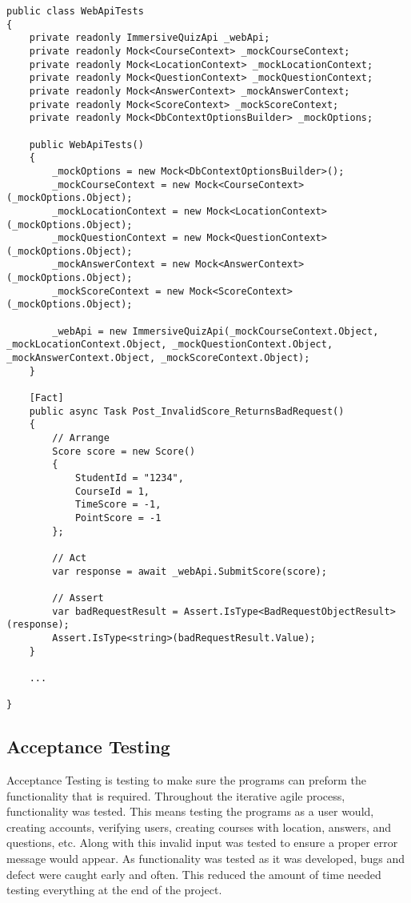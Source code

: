 \begin{lstlisting}[caption=Example Unit Test,label=lst:UnitTest]
public class WebApiTests
{
	private readonly ImmersiveQuizApi _webApi;
	private readonly Mock<CourseContext> _mockCourseContext;
	private readonly Mock<LocationContext> _mockLocationContext;
	private readonly Mock<QuestionContext> _mockQuestionContext;
	private readonly Mock<AnswerContext> _mockAnswerContext;
	private readonly Mock<ScoreContext> _mockScoreContext;
	private readonly Mock<DbContextOptionsBuilder> _mockOptions;
	
	public WebApiTests()
	{
		_mockOptions = new Mock<DbContextOptionsBuilder>();
		_mockCourseContext = new Mock<CourseContext>(_mockOptions.Object);
		_mockLocationContext = new Mock<LocationContext>(_mockOptions.Object);
		_mockQuestionContext = new Mock<QuestionContext>(_mockOptions.Object);
		_mockAnswerContext = new Mock<AnswerContext>(_mockOptions.Object);
		_mockScoreContext = new Mock<ScoreContext>(_mockOptions.Object);
		
		_webApi = new ImmersiveQuizApi(_mockCourseContext.Object, _mockLocationContext.Object, _mockQuestionContext.Object, _mockAnswerContext.Object, _mockScoreContext.Object);
	}
	
	[Fact]
	public async Task Post_InvalidScore_ReturnsBadRequest()
	{
		// Arrange
		Score score = new Score()
		{
			StudentId = "1234",
			CourseId = 1,
			TimeScore = -1,
			PointScore = -1
		};
		
		// Act
		var response = await _webApi.SubmitScore(score);
		
		// Assert
		var badRequestResult = Assert.IsType<BadRequestObjectResult>(response);
		Assert.IsType<string>(badRequestResult.Value);
	} 
	
	...
	
}
\end{lstlisting}

\subsection{Acceptance Testing}
Acceptance Testing is testing to make sure the programs can preform the functionality that is required. Throughout the iterative agile process, functionality was tested. This means testing the programs as a user would, creating accounts, verifying users, creating courses with location, answers, and questions, etc. Along with this invalid input was tested to ensure a proper error message would appear. As functionality was tested as it was developed, bugs and defect were caught early and often. This reduced the amount of time needed testing everything at the end of the project.

